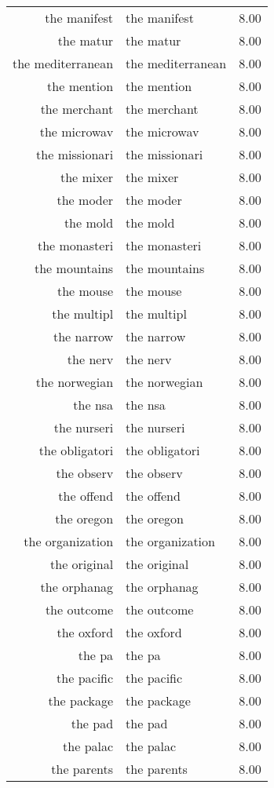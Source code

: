 \begin{table}[ht]
\begin{tabular}{rlr}
  the manifest & the manifest & 8.00 \\ 
  the matur & the matur & 8.00 \\ 
  the mediterranean & the mediterranean & 8.00 \\ 
  the mention & the mention & 8.00 \\ 
  the merchant & the merchant & 8.00 \\ 
  the microwav & the microwav & 8.00 \\ 
  the missionari & the missionari & 8.00 \\ 
  the mixer & the mixer & 8.00 \\ 
  the moder & the moder & 8.00 \\ 
  the mold & the mold & 8.00 \\ 
  the monasteri & the monasteri & 8.00 \\ 
  the mountains & the mountains & 8.00 \\ 
  the mouse & the mouse & 8.00 \\ 
  the multipl & the multipl & 8.00 \\ 
  the narrow & the narrow & 8.00 \\ 
  the nerv & the nerv & 8.00 \\ 
  the norwegian & the norwegian & 8.00 \\ 
  the nsa & the nsa & 8.00 \\ 
  the nurseri & the nurseri & 8.00 \\ 
  the obligatori & the obligatori & 8.00 \\ 
  the observ & the observ & 8.00 \\ 
  the offend & the offend & 8.00 \\ 
  the oregon & the oregon & 8.00 \\ 
  the organization & the organization & 8.00 \\ 
  the original & the original & 8.00 \\ 
  the orphanag & the orphanag & 8.00 \\ 
  the outcome & the outcome & 8.00 \\ 
  the oxford & the oxford & 8.00 \\ 
  the pa & the pa & 8.00 \\ 
  the pacific & the pacific & 8.00 \\ 
  the package & the package & 8.00 \\ 
  the pad & the pad & 8.00 \\ 
  the palac & the palac & 8.00 \\ 
  the parents & the parents & 8.00 \\ 

\end{tabular}
\end{table}
